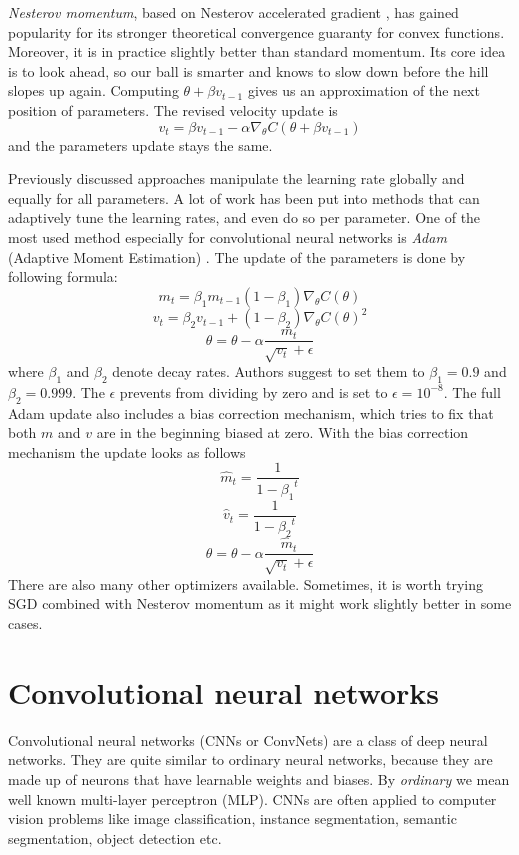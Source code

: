 \textit{Nesterov momentum}, based on Nesterov accelerated gradient
\cite{bib:nesterov1983convex}, has gained popularity for its stronger theoretical
convergence guaranty for convex functions. Moreover, it is in practice slightly better than
standard momentum. Its core idea is to look ahead, so our ball is smarter and knows
to slow down before the hill slopes up again. Computing $\theta + \beta v_{t-1}$
gives us an approximation of the next position of parameters. The revised velocity
update is
$$v_t = \beta v_{t-1} - \alpha\nabla_{\theta} C(\theta + \beta v_{t-1})$$
and the parameters update stays the same.

Previously discussed approaches manipulate the learning rate globally and equally for all
parameters. A lot of work has been put into methods that can adaptively tune the learning
rates, and even do so per parameter.
One of the most used method especially for convolutional neural networks is
\textit{Adam} (Adaptive Moment Estimation) \cite{bib:kingma2014adam}. The update of
the parameters is done by following formula:
$$m_t = \beta_1 m_{t-1}(1-\beta_1)\nabla_{\theta} C(\theta)$$
$$v_t = \beta_2 v_{t-1} + (1-\beta_2)\nabla_{\theta} C(\theta)^2$$
$$\theta = \theta - \alpha \frac{m_t}{\sqrt{v_t} + \epsilon}$$
where $\beta_1$ and $\beta_2$ denote decay rates. Authors suggest to set them to
$\beta_1 = 0.9$ and $\beta_2 = 0.999$.
The $\epsilon$ prevents from dividing by zero and is set to $\epsilon = 10^{-8}$.
The full Adam update also includes a bias correction mechanism, which tries to fix
that both $m$ and $v$ are in the beginning biased at zero. With the bias correction mechanism
the update looks as follows
$$\hat{m}_t = \frac{1}{1-{\beta_1}^t}$$
$$\hat{v}_t = \frac{1}{1-{\beta_2}^t}$$
$$\theta = \theta - \alpha \frac{\hat{m}_t}{\sqrt{v_t} + \epsilon}$$
There are also many other optimizers available. Sometimes, it is worth trying SGD
combined with Nesterov momentum as it might work slightly better in some cases.
\cite{bib:cnncs231n}

\section{Convolutional neural networks}
\label{sec:cnn}

Convolutional neural networks (CNNs or ConvNets) are a class of deep neural networks.
They are quite similar to ordinary neural networks, because they are made up of
neurons that have learnable weights and biases. By \textit{ordinary} we mean well known
multi-layer perceptron (MLP). CNNs are often applied to computer vision problems like
image classification, instance segmentation, semantic segmentation, object detection etc.

